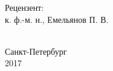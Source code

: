 \begin{titlepage}
\begin{center}
\begin{minipage}{1\textwidth}
\begin{flushright}
Рецензент:\\[-0.35cm]
к. ф.-м. н., Емельянов П. В.\\[1cm]
\end{flushright}
\end{minipage}\\[4cm]



{\large Санкт-Петербург \\ 2017}
\end{center} 

\end{titlepage}